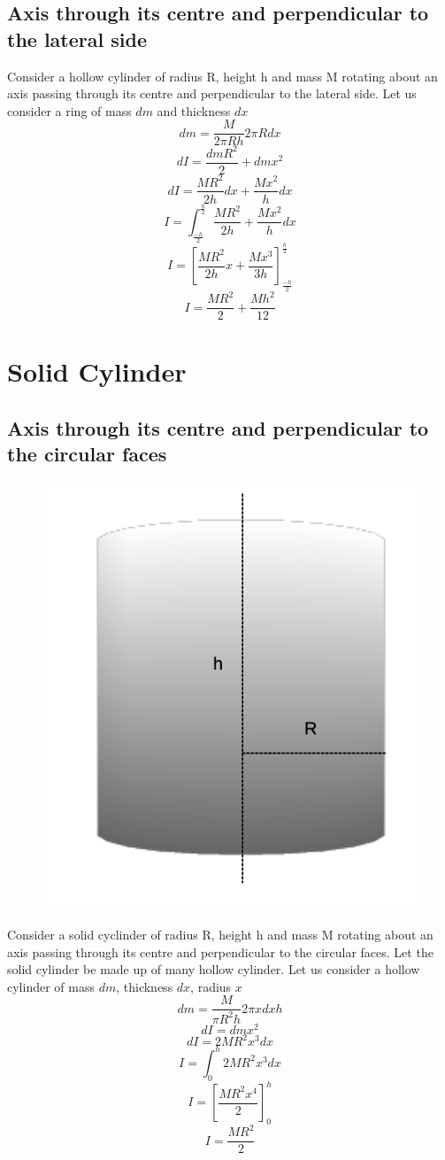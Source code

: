 \documentclass{article}
\begin{document}
\subsection{Axis through its centre and perpendicular to the lateral side}
Consider a hollow cylinder of radius R, height h and mass M rotating about an axis passing through its centre and perpendicular to the lateral side. Let us consider a ring of mass $dm$ and thickness $dx$
$$dm = \frac{M}{2\pi Rh} 2\pi Rdx$$
$$dI = \frac{dmR^2}{2} + dmx^2$$
$$dI = \frac{MR^2}{2h} dx + \frac{Mx^2}{h} dx$$
$$I = \int_{\frac{-h}{2}}^{\frac{h}{2}} \frac{MR^2}{2h} + \frac{Mx^2}{h} dx$$
$$I = \left[ \frac{MR^2}{2h}x + \frac{Mx^3}{3h} \right]_{\frac{-h}{2}}^{\frac{h}{2}}$$
$$\boxed{I = \frac{MR^2}{2} + \frac{Mh^2}{12}}$$

\section{Solid Cylinder}
\subsection{Axis through its centre and perpendicular to the circular faces}
\begin{figure}[h!]
  \includegraphics[scale=0.5]{cylinder1.png}
  \centering
\end{figure}
Consider a solid cyclinder of radius R, height h and mass M rotating about an axis passing through its centre and perpendicular to the circular faces. Let the solid cylinder be made up of many hollow cylinder.
Let us consider a hollow cylinder of mass $dm$, thickness $dx$, radius $x$
$$dm = \frac{M}{\pi R^2h}2\pi xdx h$$
$$dI = dmx^2$$
$$dI = 2MR^2x^3dx$$
$$I = \int_0^h 2MR^2x^3 dx$$
$$I = \left[ \frac{MR^2x^4}{2} \right]_0^h$$
$$\boxed{I = \frac{MR^2}{2}}$$
\end{document}
